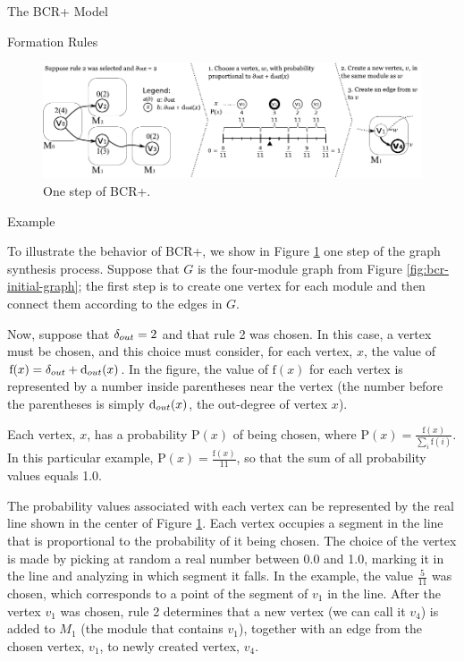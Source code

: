 \documentclass[11pt,twocolumn,a4paper,english]{article}
\begin{document}
\begin{section}{The BCR+ Model}
\begin{subsection}{Formation Rules}
\end{subsection}

\begin{figure}[tbp]
	\centering
		\includegraphics[width=\textwidth]{figures/bcr-example}
	\caption{One step of BCR+.}
	\label{fig:bcr-example}
\end{figure}

\begin{subsection}{Example} \label{sec:example}
	
	To illustrate the behavior of BCR+, we show in Figure \ref{fig:bcr-example} one step of the graph synthesis process. Suppose that $G$ is the four-module graph from Figure \ref{fig:bcr-initial-graph}; the first step is to create one vertex for each module and then connect them according to the edges in $G$. 
	
	Now, suppose that $\delta_{out} = 2$ and that rule 2 was chosen. In this case, a vertex must be chosen, and this choice must consider, for each vertex, $x$, the value of $\mathrm{f}(x) = \delta_{out} + \mathrm{d}_{out}(x)$. In the figure, the value of $\mathrm{f}(x)$ for each vertex is represented by a number inside parentheses near the vertex (the number before the parentheses is simply $\mathrm{d}_{out}(x)$, the out-degree of vertex $x$).
	
	Each vertex, $x$, has a probability $\mathrm{P}(x)$ of being chosen, where $\mathrm{P}(x) = \frac{\mathrm{f}(x)}{\sum_i \mathrm{f}(i)}$. In this particular example, $\mathrm{P}(x) = \frac{\mathrm{f}(x)}{11}$, so that the sum of all probability values equals 1.0.
	
	The probability values associated with each vertex can be represented by the real line shown in the center of Figure \ref{fig:bcr-example}. Each vertex occupies a segment in the line that is proportional to the probability of it being chosen. The choice of the vertex is made by picking at random a real number between 0.0 and 1.0, marking it in the line and analyzing in which segment it falls. In the example, the value $\frac{5}{11}$ was chosen, which corresponds to a point of the segment of $v_1$ in the line. After the vertex $v_1$ was chosen, rule 2 determines that a new vertex (we can call it $v_4$) is added to $M_1$ (the module that contains $v_1$), together with an edge from the chosen vertex, $v_1$, to newly created vertex, $v_4$.
	

\end{subsection}
\end{section}
\end{document}

